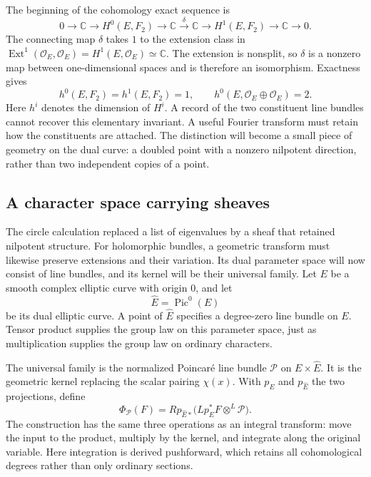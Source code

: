 \documentclass[11pt]{article}
\theoremstyle{remark}
\newcommand{\C}{\mathbb C}
\begin{document}
The beginning of the cohomology exact sequence is
\[
0\longrightarrow\C\longrightarrow H^0(E,F_2)
\longrightarrow\C\xrightarrow{\ \delta\ }\C
\longrightarrow H^1(E,F_2)\longrightarrow\C\longrightarrow0.
\]
The connecting map \(\delta\) takes \(1\) to the extension class in
\(\operatorname{Ext}^1(\mathcal O_E,\mathcal O_E)=H^1(E,\mathcal O_E)\simeq\C\).
The extension is nonsplit, so \(\delta\) is a nonzero map between one-dimensional spaces and is therefore an isomorphism. Exactness gives
\begin{equation}
h^0(E,F_2)=h^1(E,F_2)=1,
\qquad
h^0(E,\mathcal O_E\oplus\mathcal O_E)=2.
\label{categorical:extension-sections}
\end{equation}
Here \(h^i\) denotes the dimension of \(H^i\). A record of the two constituent line bundles cannot recover this elementary invariant. A useful Fourier transform must retain how the constituents are attached. The distinction will become a small piece of geometry on the dual curve: a doubled point with a nonzero nilpotent direction, rather than two independent copies of a point.

\subsection{A character space carrying sheaves}

The circle calculation replaced a list of eigenvalues by a sheaf that retained nilpotent structure. For holomorphic bundles, a geometric transform must likewise preserve extensions and their variation. Its dual parameter space will now consist of line bundles, and its kernel will be their universal family. Let \(E\) be a smooth complex elliptic curve with origin \(0\), and let
\[
\widehat E=\operatorname{Pic}^0(E)
\]
be its dual elliptic curve. A point of \(\widehat E\) specifies a degree-zero line bundle on \(E\). Tensor product supplies the group law on this parameter space, just as multiplication supplies the group law on ordinary characters.

The universal family is the normalized Poincar\'e line bundle \(\mathcal P\) on \(E\times\widehat E\). It is the geometric kernel replacing the scalar pairing \(\chi(x)\). With \(p_E\) and \(p_{\widehat E}\) the two projections, define
\begin{equation}
\Phi_{\mathcal P}(F)
=Rp_{\widehat E*}
\bigl(Lp_E^*F\otimes^{L}\mathcal P\bigr).
\label{categorical:fm}
\end{equation}
The construction has the same three operations as an integral transform: move the input to the product, multiply by the kernel, and integrate along the original variable. Here integration is derived pushforward, which retains all cohomological degrees rather than only ordinary sections.
\end{document}
